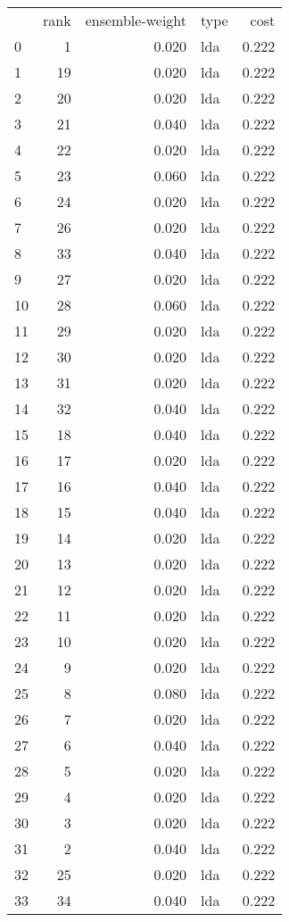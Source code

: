 \begin{table}[]
	\centering
	\begin{tabular}{lrrlr}
		   & rank & ensemble-weight & type & cost  \\
		0  & 1    & 0.020           & lda  & 0.222 \\
		1  & 19   & 0.020           & lda  & 0.222 \\
		2  & 20   & 0.020           & lda  & 0.222 \\
		3  & 21   & 0.040           & lda  & 0.222 \\
		4  & 22   & 0.020           & lda  & 0.222 \\
		5  & 23   & 0.060           & lda  & 0.222 \\
		6  & 24   & 0.020           & lda  & 0.222 \\
		7  & 26   & 0.020           & lda  & 0.222 \\
		8  & 33   & 0.040           & lda  & 0.222 \\
		9  & 27   & 0.020           & lda  & 0.222 \\
		10 & 28   & 0.060           & lda  & 0.222 \\
		11 & 29   & 0.020           & lda  & 0.222 \\
		12 & 30   & 0.020           & lda  & 0.222 \\
		13 & 31   & 0.020           & lda  & 0.222 \\
		14 & 32   & 0.040           & lda  & 0.222 \\
		15 & 18   & 0.040           & lda  & 0.222 \\
		16 & 17   & 0.020           & lda  & 0.222 \\
		17 & 16   & 0.040           & lda  & 0.222 \\
		18 & 15   & 0.040           & lda  & 0.222 \\
		19 & 14   & 0.020           & lda  & 0.222 \\
		20 & 13   & 0.020           & lda  & 0.222 \\
		21 & 12   & 0.020           & lda  & 0.222 \\
		22 & 11   & 0.020           & lda  & 0.222 \\
		23 & 10   & 0.020           & lda  & 0.222 \\
		24 & 9    & 0.020           & lda  & 0.222 \\
		25 & 8    & 0.080           & lda  & 0.222 \\
		26 & 7    & 0.020           & lda  & 0.222 \\
		27 & 6    & 0.040           & lda  & 0.222 \\
		28 & 5    & 0.020           & lda  & 0.222 \\
		29 & 4    & 0.020           & lda  & 0.222 \\
		30 & 3    & 0.020           & lda  & 0.222 \\
		31 & 2    & 0.040           & lda  & 0.222 \\
		32 & 25   & 0.020           & lda  & 0.222 \\
		33 & 34   & 0.040           & lda  & 0.222 \\
	\end{tabular}


\end{table}
